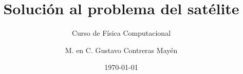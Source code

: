 



\normalfont
\usepackage{ccfonts}%
\usepackage[T1]{fontenc}%
\renewcommand{\rmdefault}{cmr}%
\linespread{1.3}
\title{Solución al problema del satélite}
\subtitle{Curso de Física Computacional}
\author{M. en C. Gustavo Contreras Mayén}
\date{\today}
\newcommand{\DrawBox}[3][]{%
    \tikz[overlay,remember picture]{
    \draw[black,#1]
      ($(#2)+(-0.5em,2.0ex)$) rectangle
      ($(#3)+(0.75em,-0.75ex)$);}
}

